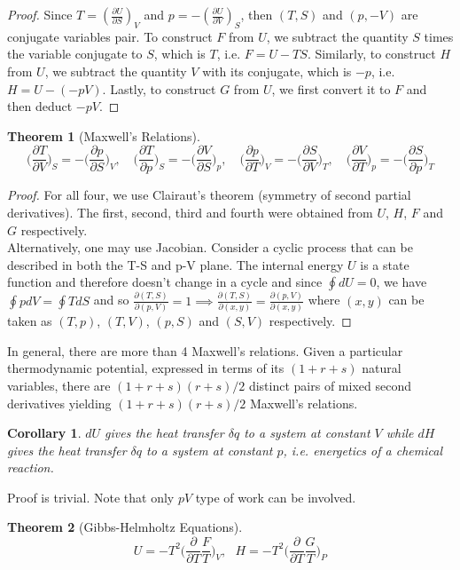 \documentclass[a4paper]{article}
\newtheorem{thm}{Theorem}[section]
\newtheorem{cor}{Corollary}[section]
\theoremstyle{new}
\begin{document}
\begin{proof}
Since $T=(\frac{\partial U}{\partial S})_V$ and $p=-(\frac{\partial U}{\partial V})_S$, then $(T,S)$ and $(p,-V)$ are conjugate variables pair. To construct $F$ from $U$, we subtract the quantity $S$ times the variable conjugate to $S$, which is $T$, i.e. $F=U-TS$. Similarly, to construct $H$ from $U$, we subtract the quantity $V$ with its conjugate, which is $-p$, i.e. $H=U-(-pV)$. Lastly, to construct $G$ from $U$, we first convert it to $F$ and then deduct $-pV$. 
\end{proof}
\begin{thm}[Maxwell's Relations]
$$\bigg(\frac{\partial T}{\partial V}\bigg)_S=-\bigg(\frac{\partial p}{\partial S}\bigg)_V,\quad\bigg(\frac{\partial T}{\partial p}\bigg)_S=-\bigg(\frac{\partial V}{\partial S}\bigg)_p,\quad\bigg(\frac{\partial p}{\partial T}\bigg)_V=-\bigg(\frac{\partial S}{\partial V}\bigg)_T,\quad\bigg(\frac{\partial V}{\partial T}\bigg)_p=-\bigg(\frac{\partial S}{\partial p}\bigg)_T$$
\end{thm}
\begin{proof}
For all four, we use Clairaut's theorem (symmetry of second partial derivatives). The first, second, third and fourth were obtained from $U$, $H$, $F$ and $G$ respectively.\\[5pt]
Alternatively, one may use Jacobian. Consider a cyclic process that can be described in both the T-S and p-V plane. The internal energy $U$ is a state function and therefore doesn't change in a cycle and since $\oint dU=0$, we have $\oint pdV=\oint TdS$ and so $\frac{\partial(T,S)}{\partial(p,V)}=1\implies\frac{\partial(T,S)}{\partial(x,y)}=\frac{\partial(p,V)}{\partial(x,y)}$ where $(x,y)$ can be taken as $(T,p)$, $(T,V)$, $(p,S)$ and $(S,V)$ respectively.
\end{proof}
In general, there are more than 4 Maxwell's relations. Given a particular thermodynamic potential, expressed in terms of its $(1+r+s)$ natural variables, there are $(1+r+s)(r+s)/2$ distinct pairs of mixed second derivatives yielding $(1 + r + s)(r + s)/2$ Maxwell’s relations.
\begin{cor}
$dU$ gives the heat transfer $\delta q$ to a system at constant $V$ while $dH$ gives the heat transfer $\delta q$ to a system at constant $p$, i.e. energetics of a chemical reaction.
\end{cor}
Proof is trivial. Note that only $pV$ type of work can be involved.
\begin{thm}[Gibbs-Helmholtz Equations]
$$U=-T^2\bigg(\frac{\partial}{\partial T}\frac{F}{T}\bigg)_V,\text{    }H=-T^2\bigg(\frac{\partial}{\partial T}\frac{G}{T}\bigg)_P$$
\end{thm}
\end{document}
